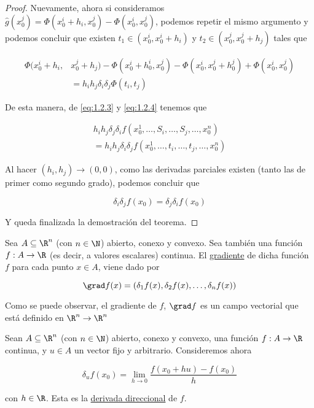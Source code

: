 \begin{proof}
    Nuevamente, ahora si consideramos $\hat{g}(x_0^j) = \Phi(x_0^i + h_i, x_0^j) - \Phi(x_0^i, x_0^j)$, podemos repetir el mismo argumento y podemos concluir que existen $t_1 \in (x_0^i, x_0^i + h_i)$ y $t_2 \in (x_0^j, x_0^j + h_j)$ tales que
    
    \begin{align}\label{eq:1.2.4}
        \Phi(x_0^i + h_i, &x_0^j + h_j) - \Phi(x_0^i + h_0^i, x_0^j) - \Phi(x_0^i, x_0^j + h_0^j) + \Phi(x_0^i, x_0^j) \nonumber \\
            &= h_ih_j \delta_i\delta_j \Phi(t_i, t_j)
    \end{align}
    
    De esta manera, de \ref{eq:1.2.3} y \ref{eq:1.2.4} tenemos que
    
    \begin{gather*}
        h_ih_j \delta_j\delta_i f(x_0^1, \dots, S_i, \dots, S_j, \dots, x_0^n) \\
        = h_ih_j \delta_i\delta_j f(x_0^1, \dots, t_i, \dots, t_j, \dots, x_0^n)
    \end{gather*}
    
    Al hacer $(h_i, h_j) \to (0, 0)$, como las derivadas parciales existen (tanto las de primer como segundo grado), podemos concluir que
    
    \[
    \delta_i\delta_j f(x_0) = \delta_j\delta_i f(x_0)
    \]
    
    Y queda finalizada la demostración del teorema.
\end{proof}

\begin{defn}
    Sea $A \subseteq \R^n$ (con $n \in \N$) abierto, conexo y convexo. Sea también una función $f: A \rightarrow \R$ (es decir, a valores escalares) continua. El \ul{gradiente} de dicha función $f$ para cada punto $x \in A$, viene dado por
    
    \[
    \grad f(x) = \left(\delta_1 f(x), \delta_2 f(x), \dots, \delta_n f(x)\right)
    \]
\end{defn}

Como se puede observar, el gradiente de $f$, $\grad f$ es un campo vectorial que está definido en $\R^n \rightarrow \R^n$

\begin{defn}
    Sean $A \subseteq \R^n$ (con $n \in \N$) abierto, conexo y convexo, una función $f: A \rightarrow \R$ continua, y $u \in A$ un vector fijo y arbitrario. Consideremos ahora
    
    \[
    \delta_u f(x_0) = \lim_{h \to 0} \frac{f(x_0 + hu) - f(x_0)}{h}
    \]
    
    \noindent con $h \in \R$. Esta es la \ul{derivada direccional} de $f$.
\end{defn}


